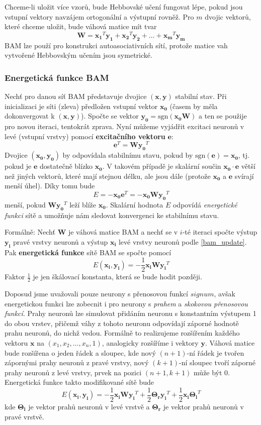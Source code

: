 \documentclass[11pt]{report} %
\renewcommand{\vec}[1]{\mathbf{#1}}
\numberwithin{equation}{section}
\begin{document}
Chceme-li uložit více vzorů, bude Hebbovské učení fungovat lépe, pokud jsou vstupní vektory navzájem ortogonální a výstupní rovněž. Pro $m$ dvojic vektorů, které chceme uložit, bude váhová matice mít tvar
$$\vec{W} = \vec{x_1}^T\vec{y_1} + \vec{x_2}^T\vec{y_2} + \dots + \vec{x_m}^T\vec{y_m}$$
BAM lze použí pro konstrukci autoasociativních sítí, protože matice vah vytvořené Hebbovským učením jsou symetrické.


\subsubsection{Energetická funkce BAM}
Nechť pro danou síť BAM představuje dvojice $(\vec{x},\vec{y})$ stabilní stav. Při inicializaci je síti (zleva) předložen vstupní vektor $\vec{x_0}$ (časem by měla dokonvergovat k $(\vec{x},\vec{y})$). Spočte se vektor $\vec{y_0} = \text{sgn}(\vec{x_0}\vec{W})$ a ten se použije pro novou iteraci, tentokrát zprava. Nyní můžeme vyjádřit excitaci neuronů v levé (vstupní vrstvy) pomocí \textbf{excitačního vektoru} $\vec{e}$:
$$\vec{e}^T = \vec{W}\vec{y_0}^T$$
Dvojice $(\vec{x_0},\vec{y_0})$ by odpovídala stabilnímu stavu, pokud by $\text{sgn}(\vec{e}) = \vec{x_0}$, tj. pokud je $\vec{e}$ dostatečně blízko $\vec{x_0}$. V takovém případě je skalární součin $\vec{x_0}\cdot \vec{e}$ větší než jiných vektorů, které mají stejnou délku, ale jsou dále (protože $\vec{x_0}$ a $\vec{e}$ svírají menší úhel). Díky tomu bude 
$$E = - \vec{x_0}\vec{e}^T = - \vec{x_0}\vec{W}\vec{y_0}^T$$
menší, pokud $\vec{W}\vec{y_0}^T$ leží blíže $\vec{x_0}$. Skalární hodnota $E$ odpovídá \textit{energetické funkci} sítě a umožňuje nám sledovat konvergenci ke stabilnímu stavu.

Formálně: Nechť $\vec{W}$ je váhová matice BAM a nechť se v $i$-té iteraci spočte výstup $\vec{y_i}$ pravé vrstvy neuronů a výstup $\vec{x_i}$ levé vrstvy neuronů podle \ref{bam_update}. Pak \textbf{energetická funkce} sítě BAM se spočte pomocí
$$E(\vec{x_i}, \vec{y_i}) = - \frac{1}{2}\vec{x_i}\vec{W}\vec{y_i}^T$$
Faktor $\frac{1}{2}$ je jen škálovací konstanta, která se bude hodit později.

Doposud jsme uvažovali pouze neurony s přenosovou funkcí $signum$, avšak energetickou funkci lze zobecnit i pro neurony s \textit{prahem} a \textit{skokovou přenosovou funkcí}. Prahy neuronů lze simulovat přidáním neuronu s konstantním výstupem 1 do obou vrstev, přičemž váhy z tohoto neuronu odpovídají záporné hodnotě prahu neuronů, do nichž vedou. Formálně to realizujeme rozšířením každého vektoru $\vec{x}$ na $(x_1, x_2, \dots, x_n, 1)$, analogicky rozšíříme i vektory $\vec{y}$. Váhová matice bude rozšířena o jeden řádek a sloupec, kde nový $(n+1)$-ní řádek je tvořen zápornými prahy neuronů z pravé vrstvy, nový $(k+1)$-ní sloupec tvoří záporné prahy neuronů z levé vrstvy, prvek na pozici $(n+1, k+1)$ může být 0. Energetická funkce takto modifikované sítě bude
$$E(\vec{x_i}, \vec{y_i}) = - \frac{1}{2}\vec{x_i}\vec{W}\vec{y_i}^T + \frac{1}{2}\vec{\Theta_r}\vec{y_i}^T + \frac{1}{2}\vec{x_i}\vec{\Theta_l}^T$$
kde $\vec{\Theta_l}$ je vektor prahů neuronů v levé vrstvě a $\vec{\Theta_r}$ je vektor prahů neuronů v pravé vrstvě.
\end{document}
